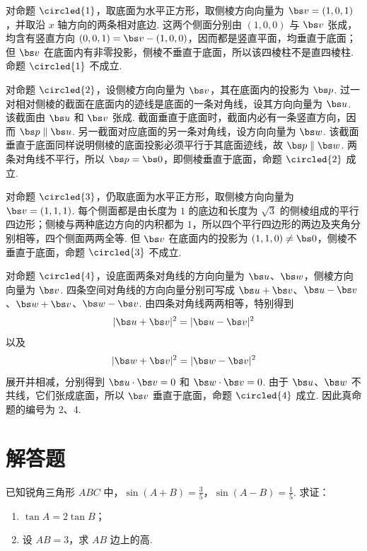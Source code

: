 \begin{solution}
对命题 \(\circled{1}\)，取底面为水平正方形，取侧棱方向向量为 \(\bs v=(1,0,1)\)，并取沿 \(x\) 轴方向的两条相对底边. 这两个侧面分别由 \((1,0,0)\) 与 \(\bs v\) 张成，均含有竖直方向 \((0,0,1)=\bs v-(1,0,0)\)，因而都是竖直平面，均垂直于底面；但 \(\bs v\) 在底面内有非零投影，侧棱不垂直于底面，所以该四棱柱不是直四棱柱. 命题 \(\circled{1}\) 不成立.

对命题 \(\circled{2}\)，设侧棱方向向量为 \(\bs v\)，其在底面内的投影为 \(\bs p\). 过一对相对侧棱的截面在底面内的迹线是底面的一条对角线，设其方向向量为 \(\bs u\). 该截面由 \(\bs u\) 和 \(\bs v\) 张成. 截面垂直于底面时，截面内必有一条竖直方向，因而 \(\bs p\parallel\bs u\). 另一截面对应底面的另一条对角线，设方向向量为 \(\bs w\). 该截面垂直于底面同样说明侧棱的底面投影必须平行于其底面迹线，故 \(\bs p\parallel\bs w\). 两条对角线不平行，所以 \(\bs p=\bs0\)，即侧棱垂直于底面，命题 \(\circled{2}\) 成立.

对命题 \(\circled{3}\)，仍取底面为水平正方形，取侧棱方向向量为 \(\bs v=(1,1,1)\). 每个侧面都是由长度为 \(1\) 的底边和长度为 \(\sqrt3\) 的侧棱组成的平行四边形；侧棱与两种底边方向的内积都为 \(1\)，所以四个平行四边形的两边及夹角分别相等，四个侧面两两全等. 但 \(\bs v\) 在底面内的投影为 \((1,1,0)\ne\bs0\)，侧棱不垂直于底面，命题 \(\circled{3}\) 不成立.

对命题 \(\circled{4}\)，设底面两条对角线的方向向量为 \(\bs u\)、\(\bs w\)，侧棱方向向量为 \(\bs v\). 四条空间对角线的方向向量分别可写成 \(\bs u+\bs v\)、\(\bs u-\bs v\)、\(\bs w+\bs v\)、\(\bs w-\bs v\). 由四条对角线两两相等，特别得到
\[
\lvert\bs u+\bs v\rvert^2=\lvert\bs u-\bs v\rvert^2
\]
以及
\[
\lvert\bs w+\bs v\rvert^2=\lvert\bs w-\bs v\rvert^2
\]
展开并相减，分别得到 \(\bs u\cdot\bs v=0\) 和 \(\bs w\cdot\bs v=0\). 由于 \(\bs u\)、\(\bs w\) 不共线，它们张成底面，所以 \(\bs v\) 垂直于底面，命题 \(\circled{4}\) 成立. 因此真命题的编号为 \(2\)、\(4\).
\end{solution}

\section{解答题}
\begin{problem}
已知锐角三角形 \(ABC\) 中，\(\sin(A+B)=\frac{3}{5}\)，\(\sin(A-B)=\frac{1}{5}\). 求证：

\begin{enumerate}
\item \( \tan A = 2\tan B \)；
\item 设 \(AB = 3\)，求 \(AB\) 边上的高.
\end{enumerate}
\end{problem}

